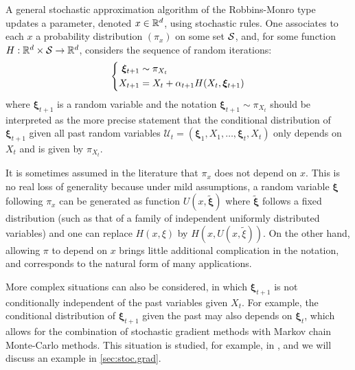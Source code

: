 A general stochastic approximation algorithm of the Robbins-Monro type updates a parameter, denoted $x\in {\mathbb{R}}^d$, using stochastic rules. One associates to each $x$ a probability distribution $(\pi_x)$ on some set ${\mathcal S}$, and, for some function $H: {\mathbb{R}}^d\times {\mathcal S} \to {\mathbb{R}}^d$, considers the sequence of random iterations:
\begin{equation}
\label{eq:sa.0}
\left\{
\begin{aligned}
\bm\xi_{t+1} &\sim \pi_{X_t}\\
X_{t+1} &= X_t + \alpha_{t+1} H(X_t, \bm\xi_{t+1})
\end{aligned}
\right.
\end{equation}
where $\boldsymbol\xi_{t+1}$ is a random variable and the notation $\boldsymbol\xi_{t+1} \sim \pi_{X_t}$ should be interpreted as the more precise statement that the conditional distribution of $\boldsymbol\xi_{t+1}$ given all past random variables $\mathcal U_t = (\boldsymbol\xi_1, X_1, \ldots, \boldsymbol\xi_t, X_t)$ only depends on $X_t$ and is given by $\pi_{X_t}$. 

It is sometimes assumed in the literature that $\pi_x$ does not depend on $x$. This is no real loss of generality because under mild assumptions, a random variable $\boldsymbol\xi$ following $\pi_x$ can be generated as function $U(x, \tilde {\boldsymbol\xi})$ where $\tilde {\boldsymbol\xi}$ follows a fixed distribution (such as that of a family of independent uniformly distributed variables) and one can replace $H(x, \xi)$ by $H(x, U(x, \tilde{\xi}))$. On the other hand, allowing $\pi$ to depend on $x$ brings little additional complication in the notation, and corresponds to the natural form of many applications.

More complex situations can also be considered, in which $\boldsymbol\xi_{t+1}$ is not conditionally independent of the past variables given $X_t$. For example, the conditional distribution of $\boldsymbol\xi_{t+1}$ given the past may also depends on $\boldsymbol\xi_t$, which allows for the combination of stochastic gradient methods with Markov chain Monte-Carlo methods. This situation is studied, for example, in \citet{metivier1987theoremes,benveniste2012adaptive}, and we will discuss an example in \cref{sec:stoc.grad}.
 

